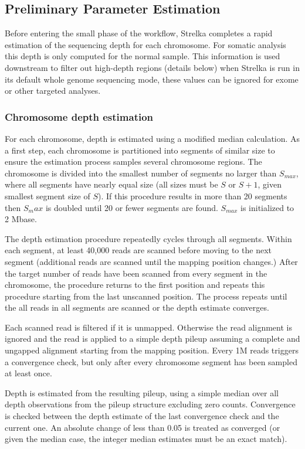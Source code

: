 \documentclass{article}
\begin{document}
\subsection{Preliminary Parameter Estimation}

Before entering the small  phase of the workflow, Strelka completes a rapid estimation of the sequencing depth for each chromosome. For somatic analysis this depth is only computed for the normal sample. This information is used downstream to filter out high-depth regions (details below) when Strelka is run in its default whole genome sequencing mode, these values can be ignored for exome or other targeted analyses.

\subsubsection{Chromosome depth estimation}

For each chromosome, depth is estimated using a modified median calculation. As a first step, each chromosome is partitioned into segments of similar size to ensure the estimation process samples several chromosome regions. The chromosome is divided into the smallest number of segments no larger than $S_{max}$, where all segments have nearly equal size (all sizes must be $S$ or $S+1$, given smallest segment size of $S$). If this procedure results in more than 20 segments then $S_max$ is doubled until 20 or fewer segments are found. $S_{max}$ is initialized to 2 Mbase.

The depth estimation procedure repeatedly cycles through all segments. Within each segment, at least 40,000 reads are scanned before moving to the next segment (additional reads are scanned until the mapping position changes.) After the target number of reads have been scanned from every segment in the chromosome, the procedure returns to the first position and repeats this procedure starting from the last unscanned position. The process repeats until the all reads in all segments are scanned or the depth estimate converges.

Each scanned read is filtered if it is unmapped. Otherwise the read alignment is ignored and the read is applied to a simple depth pileup assuming a complete and ungapped alignment starting from the mapping position. Every 1M reads triggers a convergence check, but only after every chromosome segment has been sampled at least once.

Depth is estimated from the resulting pileup, using a simple median over all depth observations from the pileup structure excluding zero counts. Convergence is checked between the depth estimate of the last convergence check and the current one. An absolute change of less than 0.05 is treated as converged (or given the median case, the integer median estimates must be an exact match).
\end{document}
